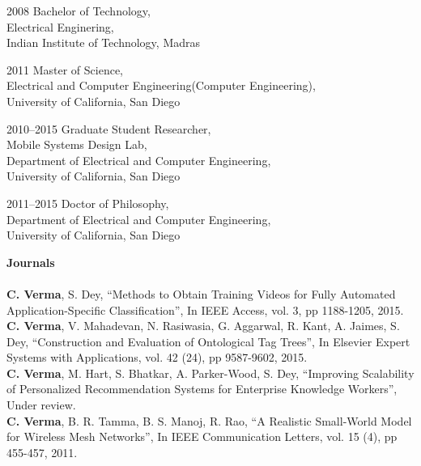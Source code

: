 \documentclass[12pt]{ucsddissertation}
\begin{document}
\begin{vita}
\noindent
\begin{cv}{}
\begin{cvlist}{}
\item[2008] Bachelor of Technology, \\Electrical Enginering, \\Indian Institute of Technology, Madras 
\item[2011] Master of Science, \\Electrical and Computer Engineering(Computer Engineering), \\University of California, San Diego 
\item[2010--2015] Graduate Student Researcher, \\Mobile Systems Design Lab, \\Department of Electrical and Computer Engineering, \\University of California, San Diego
\item[2011--2015]  Doctor of Philosophy, \\Department of Electrical and Computer Engineering, \\University of California, San Diego
\end{cvlist}
\end{cv}

\publications
{\justify
\noindent\textbf{Journals} \\ \\
\noindent \textbf{C. Verma}, S. Dey, ``Methods to Obtain Training Videos for Fully Automated Application-Specific Classification'', In IEEE Access, vol. 3, pp 1188-1205, 2015. \\

\noindent \textbf{C. Verma}, V. Mahadevan, N. Rasiwasia, G. Aggarwal, R. Kant, A. Jaimes, S. Dey, ``Construction and Evaluation of Ontological Tag Trees'', In Elsevier Expert Systems with Applications, vol. 42 (24), pp 9587-9602, 2015. \\

\noindent \textbf{C. Verma}, M. Hart, S. Bhatkar, A. Parker-Wood, S. Dey, ``Improving Scalability of Personalized Recommendation Systems for Enterprise Knowledge Workers'', Under review. \\

\noindent \textbf{C. Verma}, B. R. Tamma, B. S. Manoj, R. Rao, ``A Realistic Small-World Model for Wireless Mesh Networks'', In IEEE Communication Letters, vol. 15 (4), pp 455-457, 2011. \\

}
\end{vita}
\end{document}

